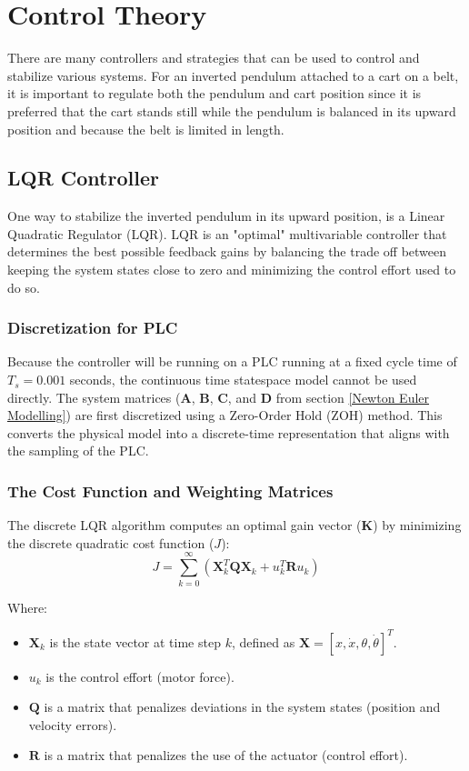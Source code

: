 \chapter{Control Theory}
\label{chap:control theory}
There are many controllers and strategies that can be used to control and stabilize various systems. For an inverted pendulum attached to a cart on a belt, it is important to regulate both the pendulum and cart position since it is preferred that the cart stands still while the pendulum is balanced in its upward position and because the belt is limited in length.

\section{LQR Controller}
One way to stabilize the inverted pendulum in its upward position, is a Linear Quadratic Regulator (LQR). LQR is an "optimal" multivariable controller that determines the best possible feedback gains by balancing the trade off between keeping the system states close to zero and minimizing the control effort used to do so.

\subsection{Discretization for PLC}
Because the controller will be running on a PLC running at a fixed cycle time of $T_s = 0.001$ seconds, the continuous time statespace model cannot be used directly.\newline
The system matrices ($\textbf{A}$, $\textbf{B}$, $\textbf{C}$, and $\textbf{D}$ from section \ref{Newton Euler Modelling}) are first discretized using a Zero-Order Hold (ZOH) method. This converts the physical model into a discrete-time representation that aligns with the sampling of the PLC.

\subsection{The Cost Function and Weighting Matrices}
The discrete LQR algorithm computes an optimal gain vector ($\textbf{K}$) by minimizing the discrete quadratic cost function ($J$):
\begin{equation}
	J = \sum_{k=0}^{\infty} \left( \textbf{X}_k^T \textbf{Q} \textbf{X}_k + u_k^T \textbf{R} u_k \right)
\end{equation}

Where:
\begin{itemize}
	\item $\textbf{X}_k$ is the state vector at time step $k$, defined as $\textbf{X} = [x, \dot{x}, \theta, \dot{\theta}]^T$.
	\item $u_k$ is the control effort (motor force).
	\item $\textbf{Q}$ is a matrix that penalizes deviations in the system states (position and velocity errors).
	\item $\textbf{R}$ is a matrix that penalizes the use of the actuator (control effort).
\end{itemize}

